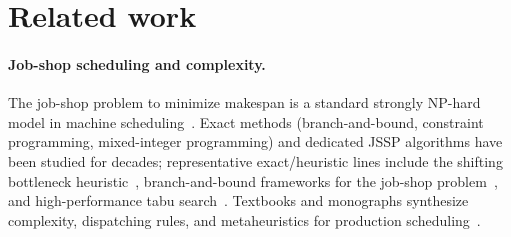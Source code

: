 \documentclass[11pt]{article}
\begin{document}
  \begin{table}[t]
    \centering
    \small
    \setlength{\tabcolsep}{4pt}
    \caption{
    Ablation study of ALAS components across key planning capabilities. 
    Removing memory degrades state consistency, removing validation harms constraint satisfaction, 
    and removing LRCP significantly reduces replanning effectiveness and increases repair cost.
    }
    \label{tab:ablation}
    \end{table}

\section{Related work}

\paragraph{Job-shop scheduling and complexity.}
The job-shop problem to minimize makespan is a standard strongly NP-hard model in machine scheduling~\cite{GJ79,LRKB77}.
Exact methods (branch-and-bound, constraint programming, mixed-integer programming) and dedicated JSSP algorithms have been studied for decades; representative exact/heuristic lines include the shifting bottleneck heuristic~\cite{Adams1988}, branch-and-bound frameworks for the job-shop problem~\cite{Carlier1989}, and high-performance tabu search~\cite{Nowicki1996}.
Textbooks and monographs synthesize complexity, dispatching rules, and metaheuristics for production scheduling~\cite{CPHandbook}.
\end{document}
